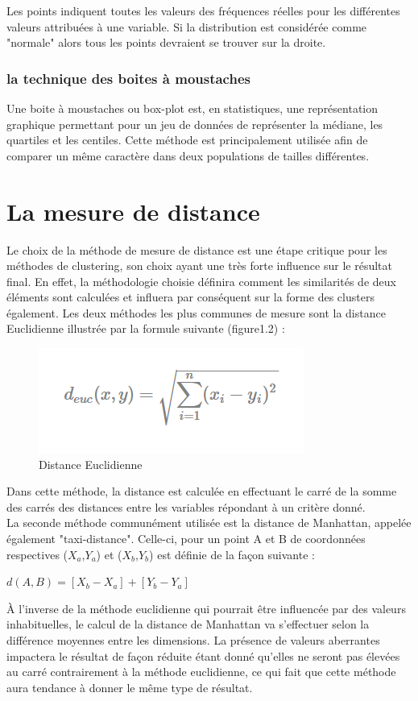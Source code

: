 \documentclass[memoire.tex]{subfiles}
\begin{document}
Les points indiquent toutes les valeurs des fréquences réelles pour les différentes valeurs attribuées à une variable. Si la distribution est considérée comme "normale" alors tous les points devraient se trouver sur la droite.
\subsubsection{la technique des boites à moustaches}

Une boite à moustaches ou box-plot est, en statistiques, une représentation graphique permettant pour un jeu de données de représenter la médiane, les quartiles et les centiles. Cette méthode est principalement utilisée afin de comparer un même caractère dans deux populations de tailles différentes.
\section{La mesure de distance}
Le choix de la méthode de mesure de distance est une étape critique pour les méthodes de clustering, son choix ayant une très forte influence sur le résultat final. En effet, la méthodologie choisie définira comment les similarités de deux éléments sont calculées et influera par conséquent sur la forme des clusters également. Les deux méthodes les plus communes de mesure sont la distance Euclidienne illustrée par la formule suivante (figure1.2) : 

	\begin{figure}[h!]
		\centerline{\includegraphics[scale=0.8]{img/euclidienne_distance.png}}
		\caption{Distance Euclidienne}
	\end{figure}
Dans cette méthode, la distance est calculée en effectuant le carré de la somme des carrés des distances entre les variables répondant à un critère donné.\\
La seconde méthode communément utilisée est la distance de Manhattan, appelée également "taxi-distance". Celle-ci, pour un point A et B de coordonnées respectives ($X_{a}$,$Y_{a}$) et ($X_{b}$,$Y_{b}$) est définie de la façon  suivante :\\
\begin{center}
$d(A,B) = [X_{b} - X_{a}] + [Y_{b} - Y_{a}]$\\
\end{center}
À l'inverse de la méthode euclidienne qui pourrait être influencée par des valeurs inhabituelles, le calcul de la distance de Manhattan va s'effectuer selon la différence moyennes entre les dimensions. La présence de valeurs aberrantes impactera le résultat de façon réduite étant donné qu'elles ne seront pas élevées au carré contrairement à la méthode euclidienne, ce qui fait que cette méthode aura tendance à donner le même type de résultat.
\newpage
\end{document}
